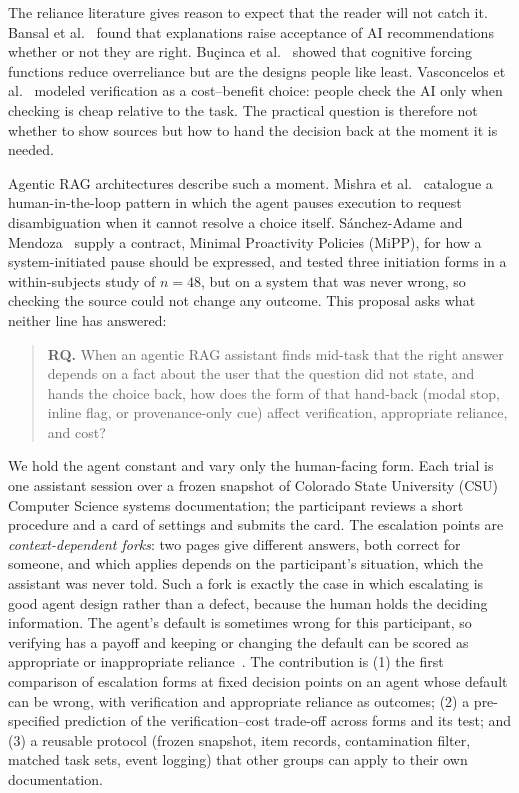 \documentclass[sigconf,nonacm]{acmart}
\begin{document}
The reliance literature gives reason to expect that the reader will not
catch it. Bansal et al.~\cite{bansal2021} found that explanations raise
acceptance of AI recommendations whether or not they are right.
Bu\c{c}inca et al.~\cite{bucinca2021} showed that cognitive forcing
functions reduce overreliance but are the designs people like least.
Vasconcelos et al.~\cite{vasconcelos2023} modeled verification as a
cost--benefit choice: people check the AI only when checking is cheap
relative to the task. The practical question is therefore not whether to
show sources but how to hand the decision back at the moment it is needed.

Agentic RAG architectures describe such a moment. Mishra et
al.~\cite{mishra2026} catalogue a human-in-the-loop pattern in which the
agent pauses execution to request disambiguation when it cannot resolve a
choice itself. S\'anchez-Adame and Mendoza~\cite{sanchezadame2026} supply
a contract, Minimal Proactivity Policies (MiPP), for how a system-initiated
pause should be expressed, and tested three initiation forms in a
within-subjects study of $n{=}48$, but on a system that was never wrong,
so checking the source could not change any outcome. This proposal asks
what neither line has answered:

\begin{quote}
\textbf{RQ.} When an agentic RAG assistant finds mid-task that the right
answer depends on a fact about the user that the question did not state,
and hands the choice back, how does the form of that hand-back (modal
stop, inline flag, or provenance-only cue) affect verification,
appropriate reliance, and cost?
\end{quote}

We hold the agent constant and vary only the human-facing form. Each trial
is one assistant session over a frozen snapshot of Colorado State
University (CSU) Computer Science systems documentation; the participant
reviews a short procedure and a card of settings and submits the card. The
escalation points are \emph{context-dependent forks}: two pages give
different answers, both correct for someone, and which applies depends on
the participant's situation, which the assistant was never told. Such a
fork is exactly the case in which escalating is good agent design rather
than a defect, because the human holds the deciding information. The
agent's default is sometimes wrong for this participant, so verifying has
a payoff and keeping or changing the default can be scored as appropriate
or inappropriate reliance~\cite{schemmer2023}. The contribution is (1) the
first comparison of escalation forms at fixed decision points on an agent
whose default can be wrong, with verification and appropriate reliance as
outcomes; (2) a pre-specified prediction of the verification--cost
trade-off across forms and its test; and (3) a reusable protocol (frozen
snapshot, item records, contamination filter, matched task sets, event
logging) that other groups can apply to their own documentation.
\end{document}

